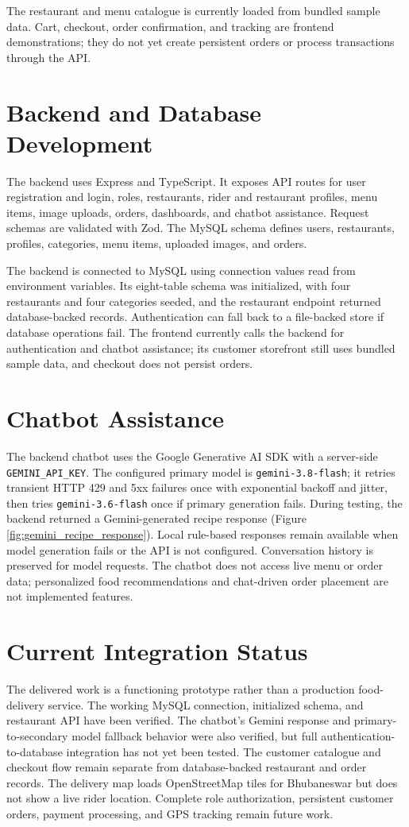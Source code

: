 The restaurant and menu catalogue is currently loaded from bundled sample data. Cart, checkout, order confirmation, and tracking are frontend demonstrations; they do not yet create persistent orders or process transactions through the API.

\section{Backend and Database Development}

The backend uses Express and TypeScript. It exposes API routes for user registration and login, roles, restaurants, rider and restaurant profiles, menu items, image uploads, orders, dashboards, and chatbot assistance. Request schemas are validated with Zod. The MySQL schema defines users, restaurants, profiles, categories, menu items, uploaded images, and orders.

The backend is connected to MySQL using connection values read from environment variables. Its eight-table schema was initialized, with four restaurants and four categories seeded, and the restaurant endpoint returned database-backed records. Authentication can fall back to a file-backed store if database operations fail. The frontend currently calls the backend for authentication and chatbot assistance; its customer storefront still uses bundled sample data, and checkout does not persist orders.

\section{Chatbot Assistance}

The backend chatbot uses the Google Generative AI SDK with a server-side \texttt{GEMINI\_API\_KEY}. The configured primary model is \texttt{gemini-3.8-flash}; it retries transient HTTP 429 and 5xx failures once with exponential backoff and jitter, then tries \texttt{gemini-3.6-flash} once if primary generation fails. During testing, the backend returned a Gemini-generated recipe response (Figure \ref{fig:gemini_recipe_response}). Local rule-based responses remain available when model generation fails or the API is not configured. Conversation history is preserved for model requests. The chatbot does not access live menu or order data; personalized food recommendations and chat-driven order placement are not implemented features.

\section{Current Integration Status}

The delivered work is a functioning prototype rather than a production food-delivery service. The working MySQL connection, initialized schema, and restaurant API have been verified. The chatbot's Gemini response and primary-to-secondary model fallback behavior were also verified, but full authentication-to-database integration has not yet been tested. The customer catalogue and checkout flow remain separate from database-backed restaurant and order records. The delivery map loads OpenStreetMap tiles for Bhubaneswar but does not show a live rider location. Complete role authorization, persistent customer orders, payment processing, and GPS tracking remain future work.

